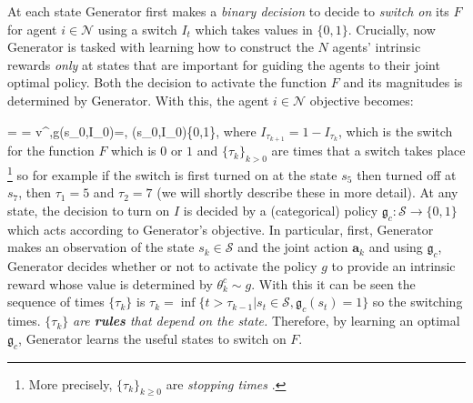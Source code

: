 \documentclass{article}
\makeatletter
\newenvironment{smalleralign}[1][\small]
 {\par\nopagebreak\leavevmode\vspace*{-\baselineskip}%
  \skip0=\abovedisplayskip
  #1%
  \def\maketag@@@##1{\hbox{\m@th\normalfont\normalsize##1}}%
  \abovedisplayskip=\skip0
  \align}
 {\endalign\ignorespacesafterend}
\makeatother
\begin{document}
At each state {\selectfont Generator} first makes a \textit{binary decision} to decide to \textit{switch on} its $F$ for agent $i\in\mathcal{N}$ using a switch $I_t$ which takes values in $\{0,1\}$. 
Crucially, now {\selectfont Generator} is tasked with learning how to construct the $N$ agents' intrinsic rewards \emph{only} at states that are important for guiding the agents to their joint optimal policy. Both the decision to activate the function $F$ and its magnitudes is determined by {\selectfont Generator}. With this, the agent $i\in\mathcal{N}$ objective becomes: 
\begin{smalleralign}
v^{\boldsymbol{\pi},g}(s_0,I_0)=\left[\sum_{t=0}^\infty \gamma^t\left\{R+F^{\boldsymbol{\theta}}\cdot I_t\right\}\right],\; \forall (s_0,I_0)\in{}\times\{0,1\},
\end{smalleralign} 
where $I_{\tau_{k+1}}=1-I_{\tau_{k}}$,  which is the switch for the function $F$ which is $0$ or $1$ and $\{\tau_k\}_{k> 0}$ are times that a switch takes place
\footnote{More precisely, $\{\tau_k\}_{k\geq 0}$ are \textit{stopping times}
\cite{oksendal2003stochastic}.} so for example if the switch is first turned on at the state $s_5$ then turned off at $s_7$, then $\tau_1=5$ and $\tau_2=7$ (we will shortly describe these in more detail). 
At any state, the decision to turn on $I$ is decided by a (categorical) policy $\mathfrak{g}_c:\mathcal{S} \to \{0,1\}$ which acts according to {\selectfont Generator}'s objective. In particular, first, {\selectfont Generator} makes an observation of the state $s_k\in\mathcal{S}$ and the joint action $\boldsymbol{a}_k$ and using $\mathfrak{g}_c$, {\selectfont Generator} decides whether or not to activate the policy $g$ to provide an intrinsic reward whose value is determined by $\theta^c_k\sim g$. With this it can be seen the sequence of times $\{\tau_k\}$ is $\tau_k=\inf\{t>\tau_{k-1}|s_t\in\mathcal{S},\mathfrak{g}_c(s_t)=1\}$ so the switching times.
$\{\tau_k\}$ \textit{are \textbf{rules} that depend on the state.} Therefore, by learning an optimal $\mathfrak{g}_c$, {\selectfont Generator} learns the useful states to switch on $F$. 
\end{document}
